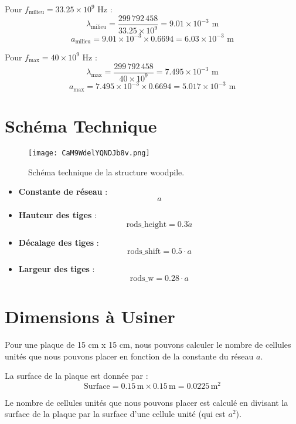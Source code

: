 \documentclass{article}
\begin{document}
Pour \( f_{\text{milieu}} = 33.25 \times 10^9 \) Hz :
\[
\lambda_{\text{milieu}} = \frac{299\,792\,458}{33.25 \times 10^9} = 9.01 \times 10^{-3} \text{ m}
\]
\[
a_{\text{milieu}} = 9.01 \times 10^{-3} \times 0.6694 = 6.03 \times 10^{-3} \text{ m}
\]

Pour \( f_{\text{max}} = 40 \times 10^9 \) Hz :
\[
\lambda_{\text{max}} = \frac{299\,792\,458}{40 \times 10^9} = 7.495 \times 10^{-3} \text{ m}
\]
\[
a_{\text{max}} = 7.495 \times 10^{-3} \times 0.6694 = 5.017 \times 10^{-3} \text{ m}
\]
\section{Schéma Technique}
\begin{figure}[h!]
    \centering
    \texttt{[image: CaM9WdelYQNDJb8v.png]}
    \caption{Schéma technique de la structure woodpile.}
    \label{fig:schema}
\end{figure}

\begin{itemize}
    \item \textbf{Constante de réseau} :  
    \[
    a
    \]
    \item \textbf{Hauteur des tiges} :  
    \[
    \text{rods\_height} = 0.3 \dot{a}
    \]
    \item \textbf{Décalage des tiges} :  
    \[
    \text{rods\_shift} = 0.5 \cdot a
    \]
    \item \textbf{Largeur des tiges} :  
    \[
    \text{rods\_w} = 0.28 \cdot a
    \]
    
\end{itemize}


\section{Dimensions à Usiner}
Pour une plaque de 15 cm x 15 cm, nous pouvons calculer le nombre de cellules unités que nous pouvons placer en fonction de la constante du réseau \( a \).

La surface de la plaque est donnée par :
\[
\text{Surface} = 0.15 \, \text{m} \times 0.15 \, \text{m} = 0.0225 \, \text{m}^2
\]

Le nombre de cellules unités que nous pouvons placer est calculé en divisant la surface de la plaque par la surface d'une cellule unité (qui est \( a^2 \)).
\end{document}
